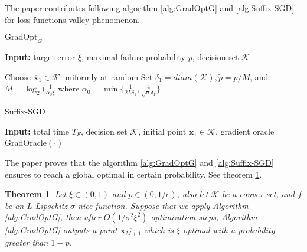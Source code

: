 The paper contributes following algorithm \ref{alg:GradOptG} and \ref{alg:Suffix-SGD} for loss functions valley phenomenon.

\begin{algorithm}
\caption{$\text{GradOpt}_G$}
\label{alg:GradOptG}
{\bfseries Input:} target error $\xi$, maximal failure probability $p$, decision set $\mathcal{K}$
\begin{algorithmic}[1]
\State Choose $\overline{\mathbf{x}}_1 \in \mathcal{K}$ uniformly at random
\State Set $\delta_1 = diam(\mathcal{K}), \tilde{p} = p/M$, and $M = \log_2(\frac{1}{\alpha_0\xi}$ where $\alpha_0=\min\big\{\frac{1}{2L\delta_1}, \frac{4}{\sqrt{\sigma}\delta_1}\big\}$  
\EndFor
\State {}
\end{algorithmic}
\end{algorithm}

\begin{algorithm}
\caption{Suffix-SGD}
\label{alg:Suffix-SGD}
{\bfseries Input:} total time $T_F$, decision set $\mathcal{K}$, initial point $\mathbf{x}_1 \in \mathcal{K}$, gradient oracle GradOracle$(\cdot)$
\begin{algorithmic}[1]
\EndFor
\State {} 
\end{algorithmic}
\end{algorithm}

The paper proves that the algorithm \ref{alg:GradOptG} and \ref{alg:Suffix-SGD} ensures to reach a global optimal in certain probability. See theorem \ref{theorem:GradOptG}.
\newtheorem{theorem:GradOptG}{Theorem}
\begin{theorem:GradOptG}
\label{theorem:GradOptG}
Let $\xi \in (0,1)$ and $p \in (0, 1/e)$, also let $\mathcal{K}$ be a convex set, and $f$ be an $L$-Lipschitz $\sigma$-nice function. Suppose that we apply Algorithm \ref{alg:GradOptG}, then after $O(1/\sigma^2\xi^2)$ optimization steps, Algorithm \ref{alg:GradOptG} outputs a point $\overline{\mathbf{x}_{M+1}}$ which is $\xi$ optimal with a probability greater than $1-p$.
\end{theorem:GradOptG}

